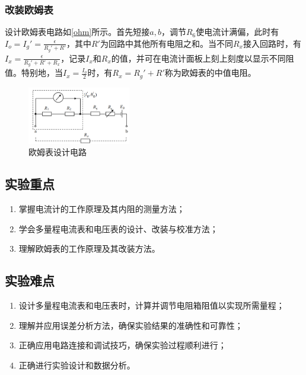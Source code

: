 \documentclass{../template/Preport}
\begin{document}
\subsubsection{改装欧姆表}
    设计欧姆表电路如\autoref{ohm}所示。首先短接$a,b$，调节$R_6$使电流计满偏，此时有$I_o = I_g' = \frac{\epsilon}{R_g'+R'}$，其中$R'$为回路中其他所有电阻之和。当不同$R_x$接入回路时，有$I_x = \frac{\epsilon}{R_g'+R'+R_x}$，记录$I_x$和$R_x$的值，并可在电流计面板上刻上刻度以显示不同阻值。特别地，当$I_x=\frac{I_o}{2}$时，有$R_x = R_g' + R'$称为欧姆表的中值电阻。
    \begin{figure}[htbp]
        \centering
        \includegraphics[width=0.4\textwidth]{figures/ohm.png}
        \caption{欧姆表设计电路}
        \label{ohm}
    \end{figure}
\subsection{实验重点}
\begin{enumerate}
    \item 掌握电流计的工作原理及其内阻的测量方法；
    \item 学会多量程电流表和电压表的设计、改装与校准方法；
    \item 理解欧姆表的工作原理及其改装方法。
\end{enumerate}
\subsection{实验难点}
\begin{enumerate}
    \item 设计多量程电流表和电压表时，计算并调节电阻箱阻值以实现所需量程；
    \item 理解并应用误差分析方法，确保实验结果的准确性和可靠性；
    \item 正确应用电路连接和调试技巧，确保实验过程顺利进行；
    \item 正确进行实验设计和数据分析。
\end{enumerate}
\end{document}
